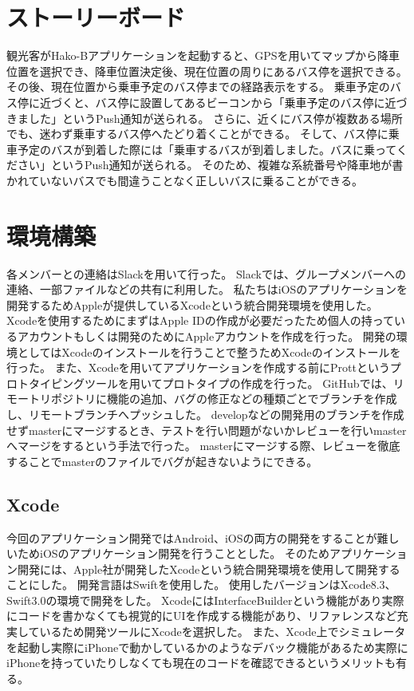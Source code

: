 \documentclass[openany,11pt,papersize]{jsbook}
\begin{document}
\section{ストーリーボード}
観光客がHako-Bアプリケーションを起動すると、GPSを用いてマップから降車位置を選択でき、降車位置決定後、現在位置の周りにあるバス停を選択できる。
その後、現在位置から乗車予定のバス停までの経路表示をする。
乗車予定のバス停に近づくと、バス停に設置してあるビーコンから「乗車予定のバス停に近づきました」というPush通知が送られる。
さらに、近くにバス停が複数ある場所でも、迷わず乗車するバス停へたどり着くことができる。
そして、バス停に乗車予定のバスが到着した際には「乗車するバスが到着しました。バスに乗ってください」というPush通知が送られる。
そのため、複雑な系統番号や降車地が書かれていないバスでも間違うことなく正しいバスに乗ることができる。


\section{環境構築}
各メンバーとの連絡はSlackを用いて行った。
Slackでは、グループメンバーへの連絡、一部ファイルなどの共有に利用した。
私たちはiOSのアプリケーションを開発するためAppleが提供しているXcodeという統合開発環境を使用した。
Xcodeを使用するためにまずはApple IDの作成が必要だったため個人の持っているアカウントもしくは開発のためにAppleアカウントを作成を行った。
開発の環境としてはXcodeのインストールを行うことで整うためXcodeのインストールを行った。
また、Xcodeを用いてアプリケーションを作成する前にProttというプロトタイピングツールを用いてプロトタイプの作成を行った。
GitHubでは、リモートリポジトリに機能の追加、バグの修正などの種類ごとでブランチを作成し、リモートブランチへプッシュした。
developなどの開発用のブランチを作成せずmasterにマージするとき、テストを行い問題がないかレビューを行いmasterへマージをするという手法で行った。
masterにマージする際、レビューを徹底することでmasterのファイルでバグが起きないようにできる。


\subsection{Xcode}
今回のアプリケーション開発ではAndroid、iOSの両方の開発をすることが難しいためiOSのアプリケーション開発を行うこととした。
そのためアプリケーション開発には、Apple社が開発したXcodeという統合開発環境を使用して開発することにした\cite{Apple}。
開発言語はSwiftを使用した。
使用したバージョンはXcode8.3、Swift3.0の環境で開発をした。
XcodeにはInterfaceBuilderという機能があり実際にコードを書かなくても視覚的にUIを作成する機能があり、リファレンスなど充実しているため開発ツールにXcodeを選択した。
また、Xcode上でシミュレータを起動し実際にiPhoneで動かしているかのようなデバック機能があるため実際にiPhoneを持っていたりしなくても現在のコードを確認できるというメリットも有る。
\end{document}
